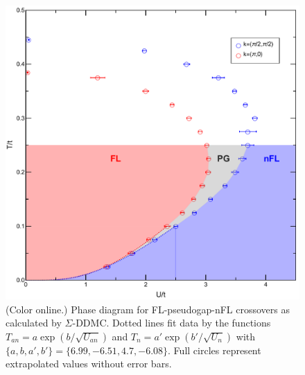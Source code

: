 \documentclass[twocolumn,notitlepage,prl,superscriptaddress,showpacs]{revtex4-1}
\begin{document}
\begin{figure}
\centering
\includegraphics[width=\linewidth]{new_pg_plot.pdf}
\caption{\label{fig:phasediagram}(Color online.) Phase diagram for FL-pseudogap-nFL  crossovers as calculated by $\Sigma$-DDMC. Dotted lines fit data by the functions $T_{an}=a\exp(b/\sqrt{U_{an}})$ and $T_n=a'\exp(b'/\sqrt{U_n})$ with $\{a,b,a',b'\}=\{6.99,-6.51,4.7,-6.08\}$. Full circles represent extrapolated values without error bars.}
\end{figure}
\end{document}
